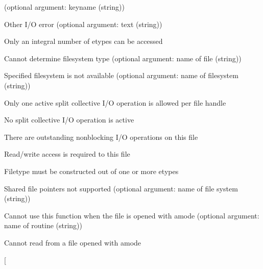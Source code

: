 \begin{description}
  (optional argument: keyname (string))
\item[\mpiconst{MPI_ERR_IO} \emsg{io}]Other I/O error (optional
  argument: text (string)) 
    \begin{description}
    \item[ ]Only
    an integral number of 
      etypes can be accessed
    \item[ ]Cannot
    determine filesystem type 
      (optional argument: name of file (string))
    \item[
    ]Specified filesystem is 
      not available (optional argument: name of filesystem (string))
    \item[
    ]Only one active split 
      collective I/O operation is allowed per file handle
    \item[
    ]No split collective I/O 
      operation is active
    \item[
    ]There are outstanding 
      nonblocking I/O operations on this file
    \item[
    ]Read/write access is required to 
      this file
    \item[ ]Filetype
    must be constructed out of 
      one or more etypes
    \item[
    ]Shared file pointers not 
      supported (optional argument: name of file system (string))
    \item[ ]Cannot
    use this function when the 
      file is opened with amode  (optional
      argument: name of routine (string))
    \item[ ]Cannot
    read from a file opened 
      with amode 
    \item[

\end{description}
\end{description}
